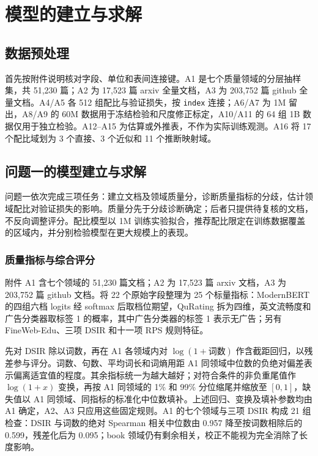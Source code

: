 \section{模型的建立与求解}
\subsection{数据预处理}
首先按附件说明核对字段、单位和表间连接键。A1 是七个质量领域的分层抽样集，共 51{,}230 篇；A2 为 17{,}523 篇 arxiv 全量文档，A3 为 203{,}752 篇 github 全量文档。A4/A5 各 512 组配比与验证损失，按 \texttt{index} 连接；A6/A7 为 1M 留出，A8/A9 的 60M 数据用于冻结检验和尺度修正标定，A10/A11 的 64 组 1B 数据仅用于独立检验。A12--A15 为估算或外推表，不作为实际训练观测。A16 将 17 个配比域划为 3 个直接、3 个近似和 11 个推断映射域。

\subsection{问题一的模型建立与求解}
问题一依次完成三项任务：建立文档及领域质量分，诊断质量指标的分歧，估计领域配比对验证损失的影响。质量分先于分歧诊断确定；后者只提供待复核的文档，不反向调整评分。配比模型以 1M 训练实验拟合，推荐配比限定在训练数据覆盖的区域内，并分别检验模型在更大规模上的表现。

\subsubsection{质量指标与综合评分}
附件 A1 含七个领域的 51{,}230 篇文档；A2 为 17{,}523 篇 arxiv 文档，A3 为 203{,}752 篇 github 文档。将 22 个原始字段整理为 25 个标量指标：ModernBERT 的四组六档 logits 经 softmax 后取档位期望，QuRating 拆为四维，英文流畅度和广告分类器取标签 1 的概率，其中广告分类器的标签 1 表示无广告；另有 FineWeb-Edu、三项 DSIR 和十一项 RPS 规则特征。

先对 DSIR 除以词数，再在 A1 各领域内对 $\log(1+\text{词数})$ 作含截距回归，以残差参与评分。词数、句数、平均词长和词熵用距 A1 同领域中位数的负绝对偏差表示偏离适宜值的程度。其余指标统一为越大越好；对符合条件的非负重尾值作 $\log(1+x)$ 变换，再按 A1 同领域的 1\% 和 99\% 分位缩尾并缩放至 $[0,1]$，缺失值以 A1 同领域、同指标的标准化中位数填补。上述回归、变换及填补参数均由 A1 确定，A2、A3 只应用这些固定规则。A1 的七个领域与三项 DSIR 构成 21 组检查：DSIR 与词数的绝对 Spearman 相关中位数由 0.957 降至按词数相除后的 0.599，残差化后为 0.095；book 领域仍有剩余相关，校正不能视为完全消除了长度影响。

